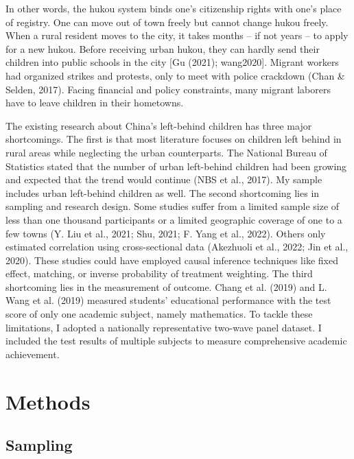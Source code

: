 \documentclass[
  man,floatsintext]{apa7}
\begin{document}
In other words, the hukou system binds one's citizenship rights with one's place of registry. One can move out of town freely but cannot change hukou freely. When a rural resident moves to the city, it takes months -- if not years -- to apply for a new hukou. Before receiving urban hukou, they can hardly send their children into public schools in the city {[}Gu (2021); wang2020{]}. Migrant workers had organized strikes and protests, only to meet with police crackdown (Chan \& Selden, 2017). Facing financial and policy constraints, many migrant laborers have to leave children in their hometowns.

The existing research about China's left-behind children has three major shortcomings. The first is that most literature focuses on children left behind in rural areas while neglecting the urban counterparts. The National Bureau of Statistics stated that the number of urban left-behind children had been growing and expected that the trend would continue (NBS et al., 2017). My sample includes urban left-behind children as well. The second shortcoming lies in sampling and research design. Some studies suffer from a limited sample size of less than one thousand participants or a limited geographic coverage of one to a few towns (Y. Liu et al., 2021; Shu, 2021; F. Yang et al., 2022). Others only estimated correlation using cross-sectional data (Akezhuoli et al., 2022; Jin et al., 2020). These studies could have employed causal inference techniques like fixed effect, matching, or inverse probability of treatment weighting. The third shortcoming lies in the measurement of outcome. Chang et al. (2019) and L. Wang et al. (2019) measured students' educational performance with the test score of only one academic subject, namely mathematics. To tackle these limitations, I adopted a nationally representative two-wave panel dataset. I included the test results of multiple subjects to measure comprehensive academic achievement.

\newpage

\hypertarget{methods}{%
\section{Methods}\label{methods}}

\hypertarget{sampling}{%
\subsection{Sampling}\label{sampling}}
\end{document}
